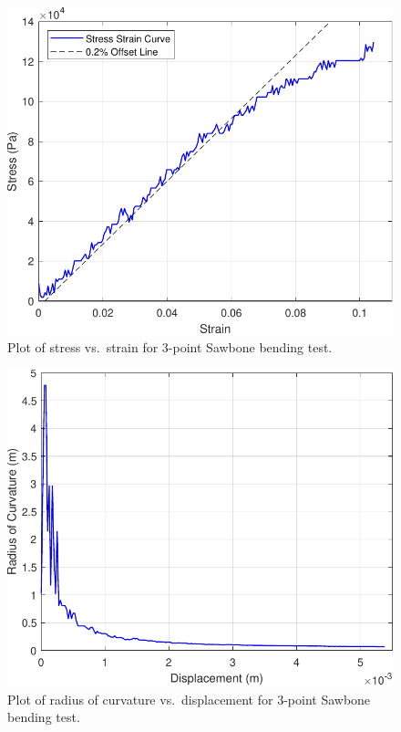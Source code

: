 \documentclass[conference, letterpaper]{IEEEtran}
\begin{document}
    \begin{figure}[htbp]
        \centerline{\includegraphics[width = 0.65\linewidth]{sawbones_ss.pdf}}
        \caption{Plot of stress vs.\ strain for 3-point Sawbone bending test.}\label{sawbones_ss}
    \end{figure}
    \begin{figure}[htbp]
        \centerline{\includegraphics[width = 0.65\linewidth]{sawbones_rd.pdf}}
        \caption{Plot of radius of curvature vs.\ displacement for 3-point Sawbone bending test.}\label{sawbones_rd}
    \end{figure}
\end{document}
